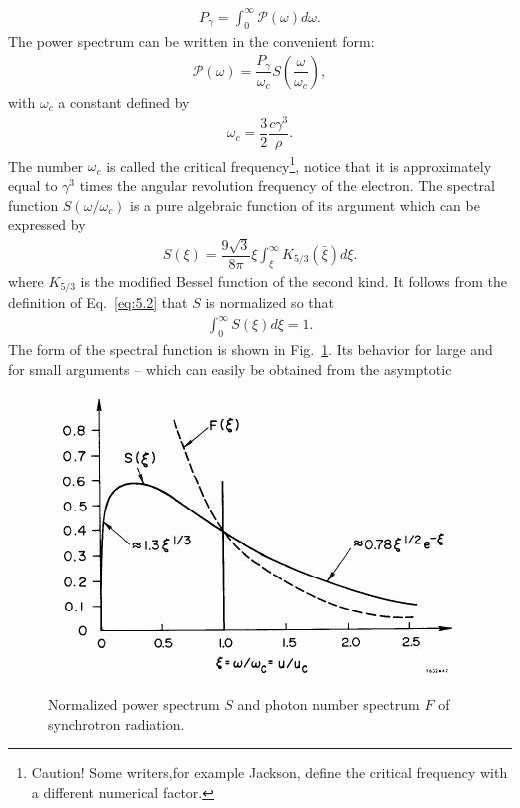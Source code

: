 \begin{align}
	P_\gamma = \int_0^{\infty} \mathscr{P}(\omega) d\omega.
\end{align}
The power spectrum can be written in the convenient form:
\begin{align} \label{eq:5.2}
	\mathscr{P}(\omega) = \dfrac{P_\gamma}{\omega_c} S\left( \dfrac{\omega}{\omega_c} \right),
\end{align}
with $\omega_c$ a constant defined by
\begin{align}
	\omega_c = \dfrac{3}{2} \dfrac{c \gamma^3}{\rho}.
\end{align}
The number $\omega_c$ is called the critical frequency\footnote{Caution!
 Some writers,for example Jackson, define the critical frequency with a different numerical factor.}, notice that it is approximately equal to $\gamma^3$ times the angular revolution
 frequency of the electron. The spectral function $S(\omega/\omega_c)$ is a pure algebraic
 function of its argument which can be expressed by
\begin{align}
	S(\xi) = \dfrac{9 \sqrt{3}}{8\pi} \xi \int_\xi^{\infty} K_{5/3} (\bar{\xi}) d\xi.
\end{align}
where $K_{5/3}$ is the modified Bessel function of the second kind. It follows from the definition of Eq.~\eqref{eq:5.2} that $S$ is normalized so that
\begin{align}
	\int_0^{\infty} S(\xi) d\xi = 1.
\end{align}
The form of the spectral function is shown in Fig.~\ref{fig:fig42}. Its behavior for large and for small arguments -- which can easily be obtained from the asymptotic
\begin{figure}[!htb]
	\centering
	\includegraphics[width=0.8\linewidth]{./Figuras/fig42.jpeg}
	\caption{Normalized power spectrum $S$ and photon number spectrum $F$ of synchrotron radiation.}
	\label{fig:fig42}
\end{figure}
